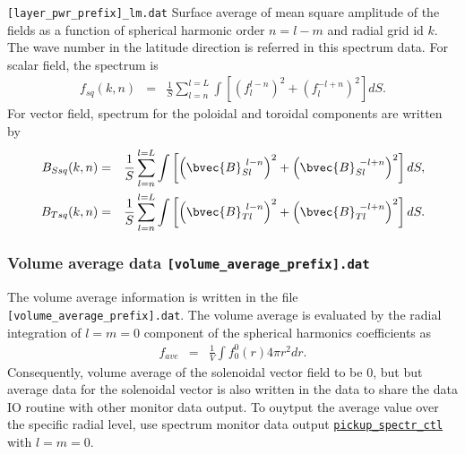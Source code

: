 \begin{description}
\item{\tt [layer\_pwr\_prefix]\_lm.dat} Surface average of mean square amplitude of the fields as a function of spherical harmonic order $n = l-m$ and radial grid id $k$. The wave number in the latitude direction is referred in this spectrum data. For scalar field, the spectrum is
\begin{eqnarray}
f_{sq}(k,n) &=& \frac{1}{S} \sum_{l=n}^{l=L} \int \left[ \left(f_{l}^{l-n}\right)^{2} + \left(f_{l}^{-l+n}\right)^2 \right] dS.
\nonumber
\end{eqnarray}
For vector field, spectrum for the poloidal and toroidal components are written by 
\begin{eqnarray}
B_{Ssq}(k,n) &=& \frac{1}{S} \sum_{l=n}^{l=L} \int  \left[\left(\bvec{B}_{Sl}^{\ l-n} \right)^{2} 
 + \left(\bvec{B}_{Sl}^{\ -l+n} \right)^{2}  \right] dS,
\nonumber \\
B_{Tsq}(k,n) &=& \frac{1}{S} \sum_{l=n}^{l=L} \int \left[\left(\bvec{B}_{Tl}^{\ l-n} \right)^{2} 
 + \left(\bvec{B}_{Tl}^{\ -l+n} \right)^{2}  \right] dS.
\nonumber
\end{eqnarray}

\end{description}
%

\subsubsection{Volume average data {\tt [volume\_average\_prefix].dat}}
The volume average information is written in the file {\tt [volume\_average\_prefix].dat}.
The volume average is evaluated by the radial integration of $l = m = 0$ component of the spherical harmonics coefficients as
\begin{eqnarray}
f_{ave} &=& \frac{1}{V} \int f_{0}^{0}(r) 4 \pi r^{2} dr.
\end{eqnarray}
Consequently, volume average of the solenoidal vector field to be 0, but but average data for the solenoidal vector is also written in the data to share the data IO routine with other monitor data output. To ouytput the average value over the specific radial level, use spectrum monitor data output \hyperref[sec:pickup_spectr_ctl]{\tt pickup\_spectr\_ctl} with $l = m = 0$.


